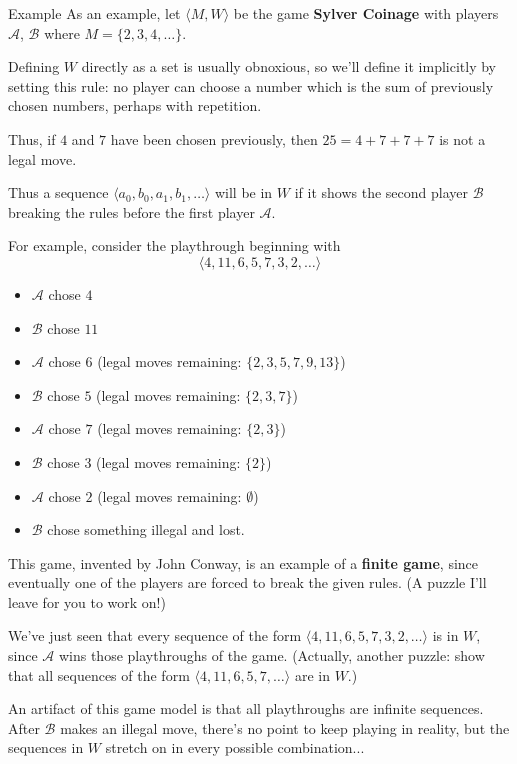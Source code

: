 \documentclass{beamer}
\theoremstyle{theorem}
\theoremstyle{definition}
\newcommand{\<}{\langle}
\renewcommand{\>}{\rangle}
\newcommand{\pl}[1]{\mathscr{#1}}
\newcommand{\vpause}{\pause\vspace{1em}}
\newcommand{\term}[1]{\textbf{#1}}
\begin{document}
\begin{frame}{Example}
  As an example, let $\<M,W\>$ be the game \term{Sylver Coinage} with players
  $\pl A$, $\pl B$ where $M=\{2,3,4,\dots\}$.

  \vpause

  Defining $W$ directly as a set is usually obnoxious, so we'll define it
  implicitly by setting this rule: no player can choose a number which is
  the sum of previously chosen numbers, perhaps with repetition.

  \vpause

  Thus, if $4$ and $7$ have been chosen previously, then $25=4+7+7+7$ is not a
  legal move.

  \vpause

  Thus a sequence $\<a_0,b_0,a_1,b_1,\dots\>$ will be in $W$ if it shows the
  second player $\pl B$ breaking the rules before the first player $\pl A$.
\end{frame}

\begin{frame}
  For example, consider the playthrough beginning with
  \[
    \<4,11,6,5,7,3,2,\dots\>
  \]
  \begin{itemize}
    \item $\pl A$ chose $4$
    \item $\pl B$ chose $11$
    \item $\pl A$ chose $6$ (legal moves remaining:
          $\{2,3,5,7,9,13\}$)
    \item $\pl B$ chose $5$ (legal moves remaining:
          $\{2,3,7\}$)
    \item $\pl A$ chose $7$ (legal moves remaining:
          $\{2,3\}$)
    \item $\pl B$ chose $3$ (legal moves remaining: $\{2\}$)
    \item $\pl A$ chose $2$ (legal moves remaining: $\emptyset$)
    \item $\pl B$ chose something illegal and lost.
  \end{itemize}
\end{frame}

\begin{frame}
  This game, invented by John Conway, is an example of a \term{finite game},
  since eventually one of the players are forced to break the given rules.
  (A puzzle I'll leave for you to work on!)

  \vpause

  We've just seen that every sequence of the form $\<4,11,6,5,7,3,2,\dots\>$
  is in $W$, since $\pl A$ wins those playthroughs of the game.
  (Actually, another puzzle: show that all sequences of the form
  $\<4,11,6,5,7,\dots\>$ are in $W$.)

  \vpause

  An artifact of this game model is that all playthroughs are infinite
  sequences. After $\pl B$ makes an illegal move, there's no point to keep
  playing in reality, but the sequences in $W$ stretch on in every possible
  combination...
\end{frame}
\end{document}
